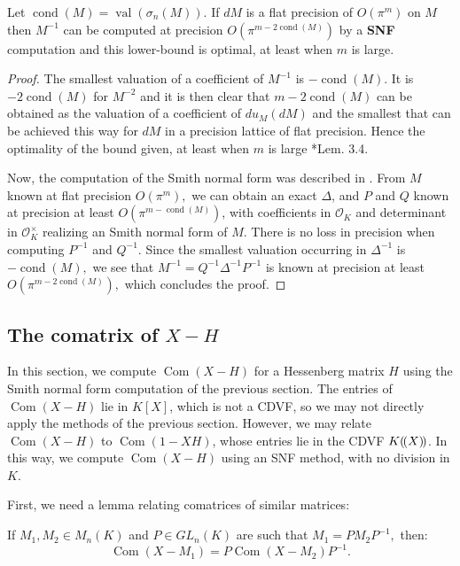 \documentclass{sig-alternate-05-2015}
\DeclareMathOperator{\val}{val}
\DeclareMathOperator{\com}{Com}
\DeclareMathOperator{\cond}{cond}
\newcommand{\OK}{\mathcal{O}_K}
\newcommand{\llp}{(\mkern-2.5mu(}
\newcommand{\rrp}{)\mkern-2.5mu)}
\begin{document}
\begin{prop}
Let $\cond(M) = \val(\sigma_n(M))$.
If $dM$ is a flat precision of $O(\pi^m)$ on $M$ then $M^{-1}$
can be computed at precision $O(\pi^{m-2\cond(M)})$ by a \textbf{SNF} computation
and this lower-bound is optimal,
at least when $m$ is large.
\end{prop}
\begin{proof}
The smallest valuation of a coefficient of $M^{-1}$ is $-\cond(M).$
It is $-2\cond(M)$ for $M^{-2}$ and it is then clear that $m-2\cond(M)$
can be obtained as the valuation of a coefficient of $du_M(dM)$
and the smallest that can be achieved this way for $dM$ in a precision lattice
of flat precision. Hence the optimality of the bound given, at least when 
$m$ is large \cite{caruso-roe-vaccon:14a}*{Lem. 3.4}.

Now, the computation of the Smith normal form was described in \cite{Vaccon-these}.
From $M$ known at flat precision $O(\pi^m),$ we can obtain an exact $\Delta$, and $P$ and $Q$ 
known at precision at least $O(\pi^{m-\cond(M)})$, with coefficients in $\OK$
and determinant in $\OK^\times$ realizing an Smith normal form of $M.$
There is no loss in precision when computing $P^{-1}$ and $Q^{-1}.$
Since the smallest valuation occurring in $\Delta^{-1}$ is $-\cond(M),$
we see that $M^{-1}=Q^{-1} \Delta^{-1} P^{-1}$ is known at precision at least $O(\pi^{m-2\cond(M)}),$
which concludes the proof.
\end{proof}

\subsection{The comatrix of $X{-}H$}

In this section, we compute $\com(X-H)$ for a Hessenberg matrix $H$
using the Smith normal form computation of the previous section.
The entries of $\com(X-H)$ lie in $K[X]$, which is not a CDVF,
so we may not directly apply the methods of the previous section.
However, we may relate $\com(X-H)$ to $\com(1-XH)$, whose
entries lie in the CDVF $K\llp X\rrp$.  In this way, we compute $\com(X-H)$
using an SNF method, with no division in $K$.

First, we need a lemma relating comatrices of
similar matrices:

\begin{lem} \label{lem:comatrix_of_similar}
If $M_1,M_2 \in M_n(K)$ and $P \in GL_n (K)$ are such that
$M_1=PM_2P^{-1},$ then:
\[ \com (X-M_1)=P \com (X-M_2) P^{-1}. \] 
\end{lem}
\end{document}
